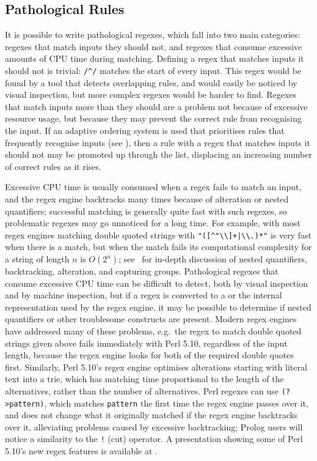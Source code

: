 \subsection{Pathological Rules}

It is possible to write pathological regexes, which fall into two main
categories: regexes that match inputs they should not, and regexes that
consume excessive amounts of CPU time during matching.  Defining a regex
that matches inputs it should not is trivial: \verb!/^/! matches the start
of every input.  This regex would be found by a tool that detects
overlapping rules, and would easily be noticed by visual inspection, but
more complex regexes would be harder to find.  Regexes that match inputs
more than they should are a problem not because of excessive resource
usage, but because they may prevent the correct rule from recognising the
input.  If an adaptive ordering system is used that prioritises rules that
frequently recognise inputs (see ), then a rule with a regex that matches inputs it should not
may be promoted up through the list, displacing an increasing number of
correct rules as it rises.

Excessive CPU time is usually consumed when a regex fails to match an
input, and the regex engine backtracks many times because of alteration or
nested quantifiers; successful matching is generally quite fast with such
regexes, so problematic regexes may go unnoticed for a long time.  For
example, with most regex engines matching double quoted strings with
\verb!"([^"\\]+|\\.)*"!  is very fast when there is a match, but when the
match fails its computational complexity for a string of length $n$ is
$O(2^{n})$; see~\cite{mastering-regular-expressions} for in-depth
discussion of nested quantifiers, backtracking, alteration, and capturing
groups.  Pathological regexes that consume excessive CPU time can be
difficult to detect, both by visual inspection and by machine inspection,
but if a regex is converted to a  or the internal
representation used by the regex engine, it may be possible to determine if
nested quantifiers or other troublesome constructs are present.  Modern
regex engines have addressed many of these problems, e.g.\ the regex to
match double quoted strings given above fails immediately with Perl 5.10,
regardless of the input length, because the regex engine looks for both of
the required double quotes first.  Similarly, Perl 5.10's regex engine
optimises alterations starting with literal text into a trie, which has
matching time proportional to the length of the alternatives, rather than
the number of alternatives.  Perl regexes can use \verb!(?>pattern)!, which
matches \verb!pattern! the first time the regex engine passes over it, and
does not change what it originally matched if the regex engine backtracks
over it, alleviating problems caused by excessive backtracking; Prolog
users will notice a similarity to the \verb'!' (cut) operator.  A
presentation showing some of Perl 5.10's new regex features is available at
.

